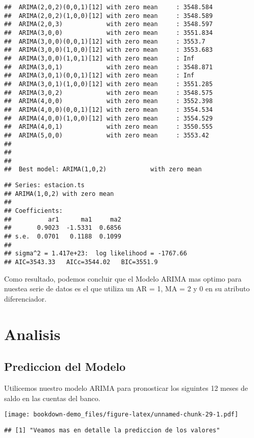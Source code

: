 \documentclass[
]{book}
\begin{document}
\begin{verbatim}
##  ARIMA(2,0,2)(0,0,1)[12] with zero mean     : 3548.584
##  ARIMA(2,0,2)(1,0,0)[12] with zero mean     : 3548.589
##  ARIMA(2,0,3)            with zero mean     : 3548.597
##  ARIMA(3,0,0)            with zero mean     : 3551.834
##  ARIMA(3,0,0)(0,0,1)[12] with zero mean     : 3553.7
##  ARIMA(3,0,0)(1,0,0)[12] with zero mean     : 3553.683
##  ARIMA(3,0,0)(1,0,1)[12] with zero mean     : Inf
##  ARIMA(3,0,1)            with zero mean     : 3548.871
##  ARIMA(3,0,1)(0,0,1)[12] with zero mean     : Inf
##  ARIMA(3,0,1)(1,0,0)[12] with zero mean     : 3551.285
##  ARIMA(3,0,2)            with zero mean     : 3548.575
##  ARIMA(4,0,0)            with zero mean     : 3552.398
##  ARIMA(4,0,0)(0,0,1)[12] with zero mean     : 3554.534
##  ARIMA(4,0,0)(1,0,0)[12] with zero mean     : 3554.529
##  ARIMA(4,0,1)            with zero mean     : 3550.555
##  ARIMA(5,0,0)            with zero mean     : 3553.42
## 
## 
## 
##  Best model: ARIMA(1,0,2)            with zero mean
\end{verbatim}

\begin{verbatim}
## Series: estacion.ts 
## ARIMA(1,0,2) with zero mean 
## 
## Coefficients:
##          ar1      ma1     ma2
##       0.9023  -1.5331  0.6856
## s.e.  0.0701   0.1188  0.1099
## 
## sigma^2 = 1.417e+23:  log likelihood = -1767.66
## AIC=3543.33   AICc=3544.02   BIC=3551.9
\end{verbatim}

Como resultado, podemos concluir que el Modelo ARIMA mas optimo para nuestea serie de datos es el que utiliza un AR = 1, MA = 2 y 0 en su atributo diferenciador.

\hypertarget{analisis}{%
\section{Analisis}\label{analisis}}

\hypertarget{prediccion-del-modelo}{%
\subsection{Prediccion del Modelo}\label{prediccion-del-modelo}}

Utilicemos nuestro modelo ARIMA para pronosticar los siguintes 12 meses de saldo en las cuentas del banco.

\texttt{[image: bookdown-demo\_files/figure-latex/unnamed-chunk-29-1.pdf]}

\begin{verbatim}
## [1] "Veamos mas en detalle la prediccion de los valores"
\end{verbatim}
\end{document}
